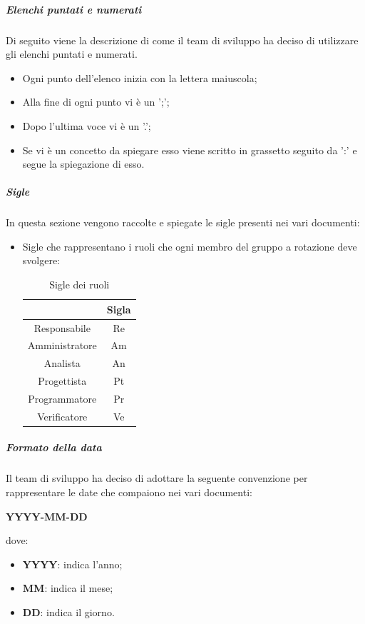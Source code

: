 \subparagraph{Elenchi puntati e numerati}
Di seguito viene la descrizione di come il team di sviluppo ha deciso di utilizzare gli elenchi puntati e numerati.
\begin {itemize}
\item Ogni punto dell'elenco inizia con la lettera maiuscola;
\item Alla fine di ogni punto vi è un ';';
\item Dopo l'ultima voce vi è un '.';
\item Se vi è un concetto da spiegare esso viene scritto in grassetto seguito da ':' e segue la spiegazione di esso.
\end {itemize}
\subparagraph{Sigle}
In questa sezione vengono raccolte e spiegate le sigle presenti nei vari documenti:
\begin{itemize}
    \item Sigle che rappresentano i ruoli che ogni membro del gruppo a rotazione deve svolgere:
          \begin{table}[H]
              \centering
              \renewcommand{\arraystretch}{1.8}
              \begin{tabular}{c|c}
                  \rowcolor[HTML]{125E28}
                  \multicolumn{1}{c}{\color[HTML]{FFFFFF}\textbf{Ruolo}}
                                 & \multicolumn{1}{c}{\color[HTML]{FFFFFF}\textbf{Sigla}} \\
                  \hline
                  Responsabile   & Re                                                     \\
                  Amministratore & Am                                                     \\
                  Analista       & An                                                     \\
                  Progettista    & Pt                                                     \\
                  Programmatore  & Pr                                                     \\
                  Verificatore   & Ve
              \end{tabular}
              \caption{Sigle dei ruoli}
          \end{table}
\end{itemize}
\subparagraph{Formato della data}
Il team di sviluppo ha deciso di adottare la seguente convenzione per rappresentare le date che compaiono nei vari documenti:
\begin{center}
    \large{\textbf{YYYY-MM-DD}}
\end{center}
dove:
\begin{itemize}
    \item \textbf{YYYY}: indica l'anno;
    \item \textbf{MM}: indica il mese;
    \item \textbf{DD}: indica il giorno.
\end{itemize}

